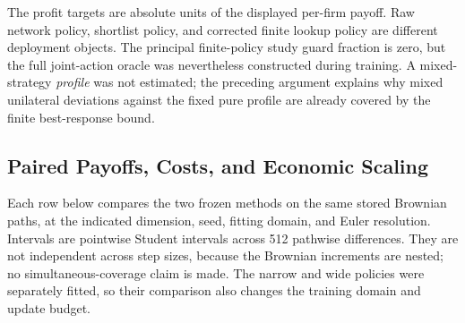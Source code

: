 \documentclass[ecta,nameyear,draft]{econsocart}
\theoremstyle{definition}
\theoremstyle{remark}
\begin{document}
The profit targets are absolute units of the displayed per-firm payoff. Raw network policy, shortlist policy, and corrected finite lookup policy are different deployment objects. The principal finite-policy study guard fraction is zero, but the full joint-action oracle was nevertheless constructed during training. A mixed-strategy \emph{profile} was not estimated; the preceding argument explains why mixed unilateral deviations against the fixed pure profile are already covered by the finite best-response bound.

\subsection{Paired Payoffs, Costs, and Economic Scaling}\label{supp:r8-paired}
Each row below compares the two frozen methods on the same stored Brownian paths, at the indicated dimension, seed, fitting domain, and Euler resolution. Intervals are pointwise Student intervals across 512 pathwise differences. They are not independent across step sizes, because the Brownian increments are nested; no simultaneous-coverage claim is made. The narrow and wide policies were separately fitted, so their comparison also changes the training domain and update budget.
\end{document}

